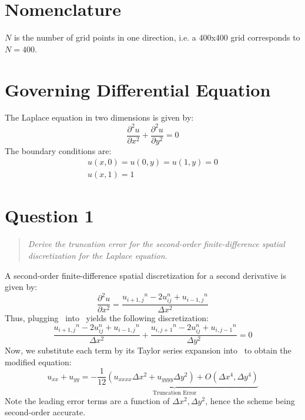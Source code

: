 \documentclass{SelimArticle}
\newcommand{\pdiff}[2]{\ensuremath{
    \frac{\partial #1}{\partial #2}
}}
\newcommand{\ip}{\ensuremath{_{i+1,j}}}
\newcommand{\im}{\ensuremath{_{i-1,j}}}
\newcommand{\jp}{\ensuremath{_{i,j+1}}}
\newcommand{\jm}{\ensuremath{_{i,j-1}}}
\begin{document}
\mytitlepage
\newpage
\section{Nomenclature}
$N$ is the number of grid points in one direction, i.e. a 400x400 grid corresponds to
$N = 400$.
\section{Governing Differential Equation}
The Laplace equation in two dimensions is given by:
\begin{equation}
    \label{eq:laplace}
    \frac{\partial^2 u}{\partial x^2} + \frac{\partial^2 u}{\partial y^2} = 0
\end{equation}
The boundary conditions are:
\begin{gather*}
    u(x,0) = u(0,y) = u(1,y) = 0\\
    u(x,1) = 1
\end{gather*}

\section{Question 1}
\begin{quote}
    \textit{
     Derive the truncation error for the second-order finite-difference spatial discretization
     for the Laplace equation.}
\end{quote}
A second-order finite-difference spatial discretization for a second derivative is given by:
\begin{equation}
    \label{eq:secord}
    \pdiff{^2u}{x^2} = \frac{u\ip^n - 2 u_{ij}^n + u\im^n}{\Delta x^2}
\end{equation}
Thus, plugging~ into~ yields the following discretization:
\begin{equation}
    \label{eq:laplacediscrete}
    \frac{u\ip^n - 2 u_{ij}^n + u\im^n}{\Delta x^2}
    + \frac{u\jp^n - 2 u_{ij}^n + u\jm^n}{\Delta y^2} = 0
\end{equation}
Now, we substitute each term by its Taylor series expansion into~ to obtain
the modified equation:
\begin{equation*}
    \label{eq:te}
    u_{xx} + u_{yy} =
    \underbrace{
        - \frac{1}{12}\left(u_{xxxx}\Delta x ^2 + u_{yyyy}\Delta y^2 \right)
        + O(\Delta x^4, \Delta y^4)
    }_{\text{Truncation Error}}
\end{equation*}
Note the leading error terms are a function of $\Delta x^2, \Delta y^2$, hence the scheme being
second-order accurate.
\end{document}
